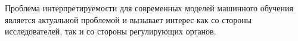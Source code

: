 \Conclusion %

Проблема интерпретируемости для современных моделей машинного обучения является актуальной проблемой и вызывает интерес как со стороны исследователей, так и со стороны регулирующих органов.
